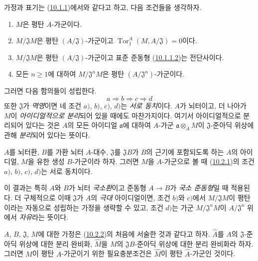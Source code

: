 \begin{env}[10.2.1]
\label{0.10.2.1-fr}
가정과 표기는 (\hyperref[0.10.1.1-fr]{10.1.1})에서와 같다고 하고, 다음
조건들을 생각하자.
\begin{enumerate}
  \item[$a)$] $M$은 평탄 $A$-가군이다.
  \item[$b)$] $M/\mathfrak{J}M$은 평탄 $(A/\mathfrak{J})$-가군이고
    $\operatorname{Tor}_1^A(M,A/\mathfrak{J})=0$이다.
  \item[$c)$] $M/\mathfrak{J}M$은 평탄 $(A/\mathfrak{J})$-가군이고
    표준 준동형 (\hyperref[0.10.1.1.2-fr]{10.1.1.2})는 전단사이다.
  \item[$d)$] 모든 $n\geq1$에 대하여 $M/\mathfrak{J}^nM$은 평탄
    $(A/\mathfrak{J}^n)$-가군이다.
\end{enumerate}
그러면 다음 함의들이 성립한다.
\[
  a\Rightarrow b\Rightarrow c\Rightarrow d
\]
또한 $\mathfrak{J}$가 \emph{멱영}이면 네 조건 $a)$, $b)$, $c)$, $d)$는
\emph{서로 동치}이다. $A$가 뇌터이고, 더 나아가 $M$이
\emph{아이디얼적으로 분리}되어 있을 때에도 마찬가지이다. 여기서
아이디얼적으로 분리되어 있다는 것은 $A$의 모든 아이디얼
$\mathfrak{a}$에 대하여 $A$-가군 $\mathfrak{a}\otimes_A M$이
$\mathfrak{J}$-준아딕 위상에 관해 \emph{분리}되어 있다는 뜻이다.
\end{env}

\begin{env}[10.2.2]
\label{0.10.2.2-fr}
$A$를 뇌터환, $B$를 가환 뇌터 $A$-대수, $\mathfrak{J}$를
$\mathfrak{J}B$가 $B$의 근기에 포함되도록 하는 $A$의 아이디얼,
$M$을 유한 생성 $B$-가군이라 하자. 그러면 $M$을 $A$-가군으로 볼 때
(\hyperref[0.10.2.1-fr]{10.2.1})의 조건 $a)$, $b)$, $c)$, $d)$는 서로
동치이다.

이 결과는 특히 $A$와 $B$가 뇌터 \emph{국소환}이고 준동형 $A\to B$가
\emph{국소 준동형}일 때 적용된다. 더 구체적으로 이때
$\mathfrak{J}$가 $A$의 \emph{극대} 아이디얼이면, 조건 $b)$와 $c)$에서
$M/\mathfrak{J}M$이 평탄이라는 자동으로 성립하는 가정을 생략할 수
있고, 조건 $d)$는 가군 $M/\mathfrak{J}^nM$이
$A/\mathfrak{J}^n$ 위에서 \emph{자유}라는 뜻이다.
\end{env}

\begin{env}[10.2.3]
\label{0.10.2.3-fr}
$A$, $B$, $\mathfrak{J}$, $M$에 대한 가정은
(\hyperref[0.10.2.2-fr]{10.2.2})의 처음에 서술한 것과 같다고 하자.
$\widehat A$를 $A$의 $\mathfrak{J}$-준아딕 위상에 대한 분리 완비화,
$\widehat M$을 $M$의 $\mathfrak{J}B$-준아딕 위상에 대한 분리
완비화라 하자. 그러면 $M$이 평탄 $A$-가군이기 위한 필요충분조건은
$\widehat M$이 평탄 $\widehat A$-가군인 것이다.
\end{env}

